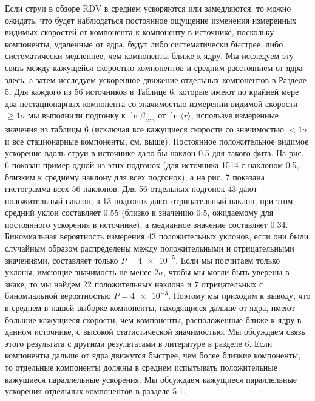 Если струи в обзоре RDV в среднем ускоряются или замедляются, то можно ожидать, что будет
наблюдаться постоянное ощущение изменения измеренных видимых скоростей от компонента к компоненту в
источнике, поскольку компоненты, удаленные от ядра, будут либо систематически быстрее, либо
систематически медленнее, чем компоненты ближе к ядру. Мы исследуем эту связь между кажущейся
скоростью компонентов и средним расстоянием от ядра здесь, а затем исследуем ускоренное движение
отдельных компонентов в Разделе 5. Для каждого из 56 источников в Таблице 6, которые имеют по
крайней мере два нестационарных компонента со значимостью измерении видимой скорости
$\geqslant1\sigma$ мы выполнили подгонку к $\ln \beta_\text{app}$ от $\ln \langle r \rangle$,
используя измеренные значения из таблицы 6 (исключая все кажущиеся скорости со значимостью
$<1\sigma$ и все стационарные компоненты, см. выше). Постоянное положительное видимое ускорение
вдоль струи в источнике дало бы наклон 0.5 для такого фита. На рис. 6 показан пример одной из этих
подгонок (для источника 1514 с наклоном 0.5, близким к среднему наклону для всех
подгонок), а на рис. 7 показана гистограмма всех 56 наклонов. Для 56 отдельных подгонок 43 дают
положительный наклон, а 13 подгонок дают отрицательный наклон, при этом средний уклон составляет
0.55 (близко к значению 0.5, ожидаемому для постоянного ускорения в источнике), а медианное
значение составляет 0.34. Биномиальная вероятность измерения 43 положительных уклонов, если они
были случайным образом распределены между положительными и отрицательными значениями, составляет
только $P = \num{4e-5}$. Если мы посчитаем только уклоны, имеющие значимость не менее $2\sigma$,
чтобы мы могли быть уверены в знаке, то мы найдем 22 положительных наклона и 7 отрицательных с
биномиальной вероятностью $P = \num{4e-3}$. Поэтому мы приходим к выводу, что в среднем в нашей
выборке компоненты, находящиеся дальше от ядра, имеют большие кажущиеся скорости, чем компоненты,
расположенные ближе к ядру в данном источнике, с высокой статистической значимостью. Мы обсуждаем
связь этого результата с другими результатами в литературе в разделе 6. Если компоненты дальше от
ядра движутся быстрее, чем более близкие компоненты, то отдельные компоненты должны в среднем
испытывать положительные кажущиеся параллельные ускорения. Мы обсуждаем кажущиеся параллельные
ускорения отдельных компонентов в разделе 5.1.
